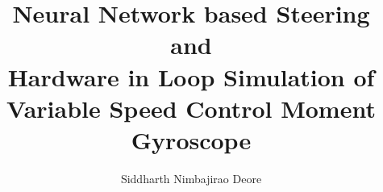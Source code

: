 \documentclass[italian,oneside,LaM,binding=0.0cm]{sapthesis}
\title{Neural Network based Steering and \\ Hardware in Loop Simulation of Variable Speed Control Moment Gyroscope}
\author{Siddharth Nimbajirao Deore}
\begin{document}
\frontmatter
\maketitle
\begin{comment}
\dedication{Dedicated to\\ Aai and Aaba}

\begin{abstract}
\phantomsection
\addcontentsline{toc}{chapter}{Abstract}
Derived EOM, studied singularity, made some simulations, rl thinngs are done, for testing made some c++ based things, traing code, ground station, mech desing, electronic , firmware
\end{abstract}

\begin{acknowledgments}
\phantomsection
\addcontentsline{toc}{chapter}{Acknowledgments}
Sab ki dua

\end{acknowledgments}

\newglossaryentry{policy}{
    name = policy,
    description = neural network which produces appropriate actions.
}
\end{comment}



\renewcommand{\contentsname}{Table of Contents}
\tableofcontents

\listoftables

\listoffigures


\printacronyms[type=\acronymtype, title=List of Acronyms]




\nomlabelwidth=25mm 

\renewcommand\nomgroup[1]{%
  \item[\bfseries
  \ifstrequal{#1}{A}{Spacecraft Attitude Dynamics}{%
  \ifstrequal{#1}{B}{AI based Learning Agent}{%
  \ifstrequal{#1}{C}{Other Symbols}{}}}%
]}

\printnomenclature
{}
\end{document}
